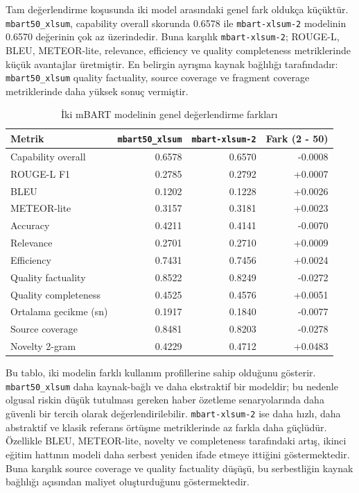 \documentclass[12pt,a4paper]{article}
\begin{document}
Tam değerlendirme koşusunda iki model arasındaki genel fark oldukça küçüktür. \texttt{mbart50\_xlsum}, capability overall skorunda 0.6578 ile \texttt{mbart-xlsum-2} modelinin 0.6570 değerinin çok az üzerindedir. Buna karşılık \texttt{mbart-xlsum-2}; ROUGE-L, BLEU, METEOR-lite, relevance, efficiency ve quality completeness metriklerinde küçük avantajlar üretmiştir. En belirgin ayrışma kaynak bağlılığı tarafındadır: \texttt{mbart50\_xlsum} quality factuality, source coverage ve fragment coverage metriklerinde daha yüksek sonuç vermiştir.

\begin{table}[H]
\centering
\caption{İki mBART modelinin genel değerlendirme farkları}
\label{tab:mbart-result-comparison}
\begin{tabular}{lrrr}
\toprule
Metrik & \texttt{mbart50\_xlsum} & \texttt{mbart-xlsum-2} & Fark (2 - 50) \\
\midrule
Capability overall & 0.6578 & 0.6570 & -0.0008 \\
ROUGE-L F1 & 0.2785 & 0.2792 & +0.0007 \\
BLEU & 0.1202 & 0.1228 & +0.0026 \\
METEOR-lite & 0.3157 & 0.3181 & +0.0023 \\
Accuracy & 0.4211 & 0.4141 & -0.0070 \\
Relevance & 0.2701 & 0.2710 & +0.0009 \\
Efficiency & 0.7431 & 0.7456 & +0.0024 \\
Quality factuality & 0.8522 & 0.8249 & -0.0272 \\
Quality completeness & 0.4525 & 0.4576 & +0.0051 \\
Ortalama gecikme (sn) & 0.1917 & 0.1840 & -0.0077 \\
Source coverage & 0.8481 & 0.8203 & -0.0278 \\
Novelty 2-gram & 0.4229 & 0.4712 & +0.0483 \\
\bottomrule
\end{tabular}
\end{table}

Bu tablo, iki modelin farklı kullanım profillerine sahip olduğunu gösterir. \texttt{mbart50\_xlsum} daha kaynak-bağlı ve daha ekstraktif bir modeldir; bu nedenle olgusal riskin düşük tutulması gereken haber özetleme senaryolarında daha güvenli bir tercih olarak değerlendirilebilir. \texttt{mbart-xlsum-2} ise daha hızlı, daha abstraktif ve klasik referans örtüşme metriklerinde az farkla daha güçlüdür. Özellikle BLEU, METEOR-lite, novelty ve completeness tarafındaki artış, ikinci eğitim hattının modeli daha serbest yeniden ifade etmeye ittiğini göstermektedir. Buna karşılık source coverage ve quality factuality düşüşü, bu serbestliğin kaynak bağlılığı açısından maliyet oluşturduğunu göstermektedir.
\end{document}

